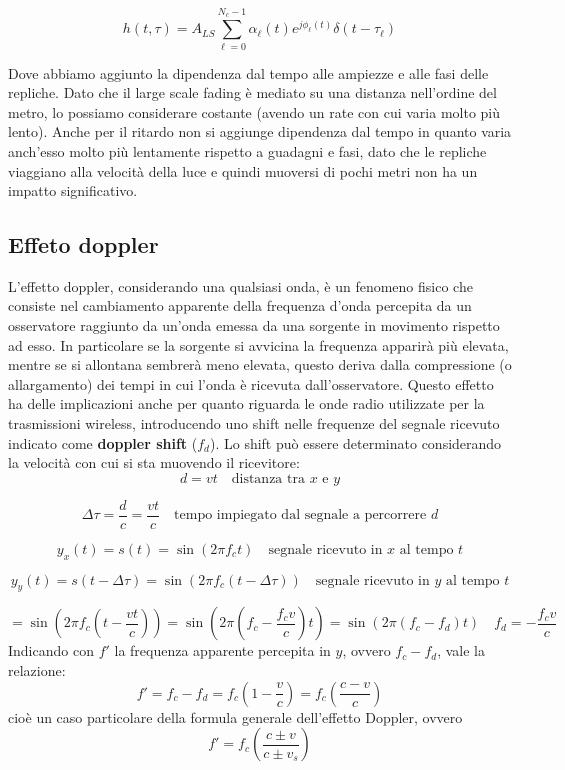 \[
    h(t, \tau) = A_{LS} \sum_{\ell=0}^{N_c-1} \alpha_{\ell}(t) e^{j\phi_{\ell}(t)} \delta(t - \tau_{\ell})
\]

Dove abbiamo aggiunto la dipendenza dal tempo alle ampiezze e alle fasi delle repliche. Dato che il large scale fading è mediato su una distanza nell'ordine del metro, lo possiamo considerare costante (avendo un rate con cui varia molto più lento).
Anche per il ritardo non si aggiunge dipendenza dal tempo in quanto varia anch'esso molto più lentamente rispetto a guadagni e fasi, dato che le repliche viaggiano alla velocità della luce e quindi muoversi di pochi metri non ha un impatto significativo.






\subsection*{Effeto doppler}
L'effetto doppler, considerando una qualsiasi onda, è un fenomeno fisico che consiste nel cambiamento apparente della frequenza d'onda percepita da un osservatore raggiunto da un'onda emessa da una sorgente in movimento rispetto ad esso.
In particolare se la sorgente si avvicina la frequenza apparirà più elevata, mentre se si allontana sembrerà meno elevata, questo deriva dalla compressione (o allargamento) dei tempi in cui l'onda è ricevuta dall'osservatore.
Questo effetto ha delle implicazioni anche per quanto riguarda le onde radio utilizzate per la trasmissioni wireless, introducendo uno shift nelle frequenze del segnale ricevuto indicato come \textbf{doppler shift} ($f_d$).
Lo shift può essere determinato considerando la velocità con cui si sta muovendo il ricevitore:
\[
    d = vt \quad \text{distanza tra $x$ e $y$}
\]

\[
    \Delta \tau = \frac{d}{c} = \frac{vt}{c} \quad \text{tempo impiegato dal segnale a percorrere $d$}
\]

\[
    y_x(t) = s(t) = \sin(2\pi f_c t) \quad \text{segnale ricevuto in $x$ al tempo $t$}
\]

\[
    y_y(t) = s(t-\Delta \tau) = \sin(2\pi f_c (t-\Delta \tau)) \quad \text{segnale ricevuto in $y$ al tempo $t$}
\]

\[
    = \sin\left(2\pi f_c \left(t - \frac{vt}{c}\right)\right) = \sin\left(2\pi \left(f_c - \frac{f_c v}{c}\right) t\right) = \sin\left(2\pi \left(f_c - f_d \right) t \right) \quad \boxed{f_d = -\frac{f_c v}{c}}
\]
Indicando con $f'$ la frequenza apparente percepita in $y$, ovvero $f_c - f_d$, vale la relazione:
\[
    f' = f_c - f_d = f_c \left(1 - \frac{v}{c}\right) = f_c \left( \frac{c - v}{c} \right)
\]
cioè un caso particolare della formula generale dell'effetto Doppler, ovvero
\[
    f' = f_c \left( \frac{c \pm v}{c \pm v_s} \right)
\]

